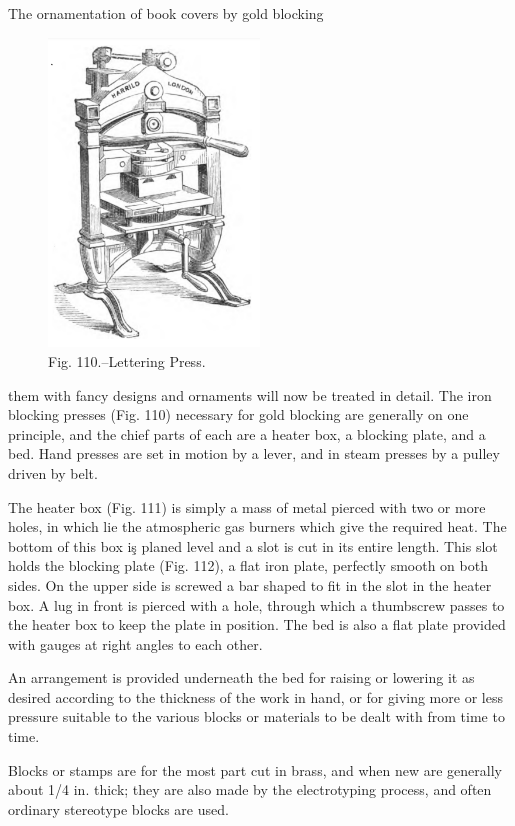 \documentclass[twoside]{book}
\begin{document}
The ornamentation of book covers by gold blocking
	\begin{figure}[h]
		\centering
		\includegraphics[width=0.5\textwidth]{Figures/_110.png}
		\caption*{Fig. 110.--Lettering Press.}
	\end{figure}
them with fancy designs and ornaments will now
be treated in detail. The iron blocking presses
(Fig. 110) necessary for gold blocking are generally
on one principle, and the chief parts of each are a
heater box, a blocking plate, and a bed. Hand
presses are set in motion by a lever, and in steam
presses by a pulley driven by belt.

The heater box (Fig. 111) is simply a mass of
metal pierced with two or more holes, in which lie
\pagebreak
the atmospheric gas burners which give the required
heat. The bottom of this box iş planed level and a
slot is cut in its entire length. This slot holds the
blocking plate (Fig. 112), a flat iron plate, perfectly
smooth on both sides. On the upper side is screwed
a bar shaped to fit in the slot in the heater box. A
lug in front is pierced with a hole, through which a
thumbscrew passes to the heater box to keep the
plate in position. The bed is also a flat plate
provided with gauges at right angles to each other.

An arrangement is provided underneath the bed
for raising or lowering it as desired according to the
thickness of the work in hand, or for giving more
or less pressure suitable to the various blocks or
materials to be dealt with from time to time.

Blocks or stamps are for the most part cut in
brass, and when new are generally about 1/4 in. thick;
they are also made by the electrotyping process, and
often ordinary stereotype blocks are used.
\end{document}
